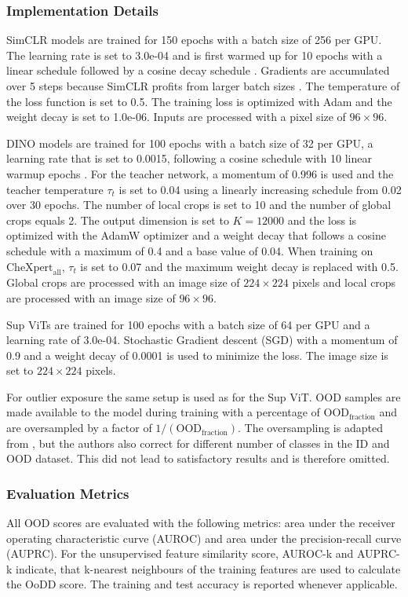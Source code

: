 \subsubsection{Implementation Details}
SimCLR models are trained for 150 epochs with a batch size of 256 per GPU.
The learning rate is set to 3.0e-04 and is first warmed up for 10 epochs with a linear schedule \citep{Goyal2017} followed by a cosine decay schedule \citep{Chen2020,Loshchilov2016}. 
Gradients are accumulated over 5 steps because SimCLR profits from larger batch sizes \citep{Chen2020}.
The temperature of the loss function is set to 0.5. 
The training loss is optimized with Adam \citep{Kingma2014} and the weight decay is set to 1.0e-06.
Inputs are processed with a pixel size of $96\times96$.
\par
DINO models are trained for 100 epochs with a batch size of 32 per GPU, a learning rate that is set to 0.0015, following a cosine schedule \citep{Caron2021,Loshchilov2016} with 10 linear warmup epochs \citep{Goyal2017}.
For the teacher network, a momentum of 0.996 is used and the teacher temperature $\tau_t$ is set to 0.04 using a linearly increasing schedule from 0.02 over 30 epochs.
The number of local crops is set to 10 and the number of global crops equals 2.
The output dimension is set to $K=12000$ and the loss is optimized with the AdamW optimizer \citep{Loshchilov2018} and a weight decay that follows a cosine schedule with a maximum of 0.4 and a base value of 0.04.
When training on $\text{CheXpert}_\text{all}$, $\tau_t$ is set to 0.07 and the maximum weight decay is replaced with 0.5.
Global crops are processed with an image size of $224\times224$ pixels and local crops are processed with an image size of $96\times96$.
\par
Sup ViTs are trained for 100 epochs with a batch size of 64 per GPU and a learning rate of 3.0e-04. 
Stochastic Gradient descent (SGD) with a momentum of 0.9 and a weight decay of 0.0001 is used to minimize the loss.
The image size is set to $224\times224$ pixels.
\par
For outlier exposure the same setup is used as for the Sup ViT.
OOD samples are made available to the model during training with a percentage of $\text{OOD}_\text{fraction}$ and are oversampled by a factor of $1/(\text{OOD}_\text{fraction})$.
The oversampling is adapted from \citep{Fort2021}, but the authors also correct for different number of classes in the ID and OOD dataset.
This did not lead to satisfactory results and is therefore omitted.
\subsubsection{Evaluation Metrics}
All OOD scores are evaluated with the following metrics: area under the receiver operating characteristic curve (AUROC) and area under the precision-recall curve (AUPRC).
For the unsupervised feature similarity score, AUROC-k and AUPRC-k indicate, that k-nearest neighbours of the training features are used to calculate the OoDD score.
The training and test accuracy is reported whenever applicable.